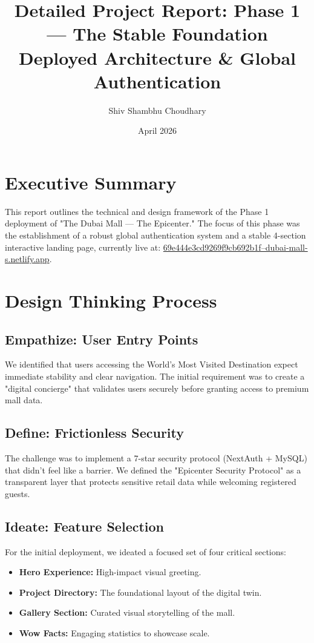 \documentclass[11pt,a4paper]{article}
\title{Detailed Project Report: Phase 1 --- The Stable Foundation \\ \large Deployed Architecture \& Global Authentication}
\author{Shiv Shambhu Choudhary}
\date{April 2026}
\begin{document}
\maketitle

\section{Executive Summary}
This report outlines the technical and design framework of the Phase 1 deployment of "The Dubai Mall --- The Epicenter." The focus of this phase was the establishment of a robust global authentication system and a stable 4-section interactive landing page, currently live at: \href{https://69e444e3cd9269f9cb692b1f--dubai-mall-s.netlify.app/}{69e444e3cd9269f9cb692b1f--dubai-mall-s.netlify.app}.

\section{Design Thinking Process}

\subsection{Empathize: User Entry Points}
We identified that users accessing the World's Most Visited Destination expect immediate stability and clear navigation. The initial requirement was to create a "digital concierge" that validates users securely before granting access to premium mall data.

\subsection{Define: Frictionless Security}
The challenge was to implement a 7-star security protocol (NextAuth + MySQL) that didn't feel like a barrier. We defined the "Epicenter Security Protocol" as a transparent layer that protects sensitive retail data while welcoming registered guests.

\subsection{Ideate: Feature Selection}
For the initial deployment, we ideated a focused set of four critical sections:
\begin{itemize}
    \item \textbf{Hero Experience:} High-impact visual greeting.
    \item \textbf{Project Directory:} The foundational layout of the digital twin.
    \item \textbf{Gallery Section:} Curated visual storytelling of the mall.
    \item \textbf{Wow Facts:} Engaging statistics to showcase scale.
\end{itemize}
\end{document}
